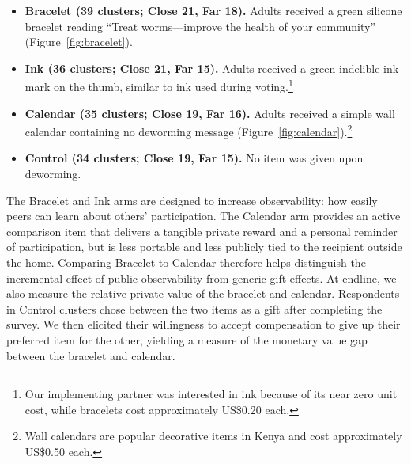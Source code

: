 \documentclass[ECM\space ReStud.tex]{subfiles}
\begin{document}
\begin{itemize}
\item \textbf{Bracelet (39 clusters; Close 21, Far 18).}
  Adults received a green silicone bracelet reading ``Treat worms---improve the health of your community'' (Figure~\ref{fig:bracelet}).

\item \textbf{Ink (36 clusters; Close 21, Far 15).}
  Adults received a green indelible ink mark on the thumb, similar to ink used during voting.\footnote{Our implementing partner was interested in ink because of its near zero unit cost, while bracelets cost approximately US\$0.20 each.}

\item \textbf{Calendar (35 clusters; Close 19, Far 16).}
  Adults received a simple wall calendar containing no deworming message (Figure~\ref{fig:calendar}).\footnote{Wall calendars are popular decorative items in Kenya and cost approximately US\$0.50 each.}

\item \textbf{Control (34 clusters; Close 19, Far 15).}
  No item was given upon deworming.
\end{itemize}

The Bracelet and Ink arms are designed to increase observability: how easily peers can learn about others' participation. The Calendar arm provides an active comparison item that delivers a tangible private reward and a personal reminder of participation, but is less portable and less publicly tied to the recipient outside the home. Comparing Bracelet to Calendar therefore helps distinguish the incremental effect of public observability from generic gift effects. At endline, we also measure the relative private value of the bracelet and calendar. Respondents in Control clusters chose between the two items as a gift after completing the survey. We then elicited their willingness to accept compensation to give up their preferred item for the other, yielding a measure of the monetary value gap between the bracelet and calendar.
\end{document}
